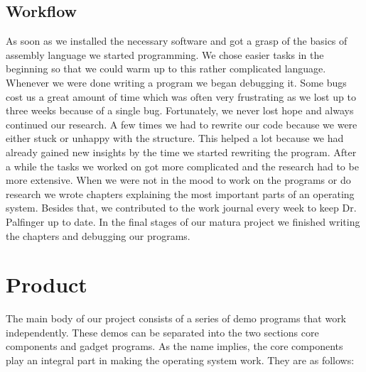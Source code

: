 \documentclass{article}
\begin{document}
\subsection{Workflow}

As soon as we installed the necessary software and got a grasp of the basics of assembly language we started programming. We chose easier tasks in the beginning so that
we could warm up to this rather complicated language. Whenever we were done writing a program we began debugging it. Some bugs cost us a great amount of time which 
was often very frustrating as we lost up to three weeks because of a single bug. Fortunately, we never lost hope and always continued our research. A few times we 
had to rewrite our code because we were either stuck or unhappy with the structure. This helped a lot because we had already gained new insights by the time we started rewriting 
the program. After a while the tasks we worked on got more complicated and the research had to be more extensive. When we were not in the mood to work on the programs or do 
research we wrote chapters explaining the most important parts of an operating system. Besides that, we contributed to the work journal every week to keep Dr. Palfinger up 
to date. In the final stages of our matura project we finished writing the chapters and debugging our programs. 


\section{Product}

The main body of our project consists of a series of demo programs that work independently.
These demos can be separated into the two sections core components and gadget programs.
As the name implies, the core components play an integral part in making the operating
system work. They are as follows:
\end{document}
